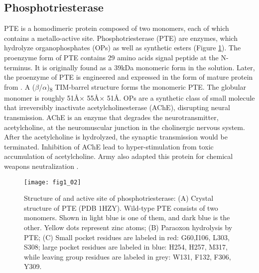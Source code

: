 \begin{refsection}
\subsection{Phosphotriesterase} 
\label{sec:pte-intro}

PTE is a homodimeric protein composed of two monomers, each of which contains a
metallo-active site. Phosphotriesterase (PTE) are enzymes, which hydrolyze
organophosphates (OPs) as well as synthetic esters (Figure
\ref{fig:pte-structure})\cite{Ghanem2005a}. The proenzyme form of PTE contains
29 amino acids signal peptide at the N-terminus. It is originally found as a
39kDa monomeric form in the solution\cite{Mulbry1989}. Later, the proenzyme of
PTE is engineered and expressed in the form of mature protein from . A ($\beta$/$\alpha$)\textsubscript{8} TIM-barrel structure forms the
monomeric PTE\cite{Roodveldt2005,Seibert2005}. The globular monomer is roughly
51\AA $\times$ 55\AA $\times$ 51\AA.  OPs are a synthetic class of small molecule
that irreversibly inactivate acetylcholinesterase (AChE), disrupting
neural transmission. AChE is an enzyme that degrades the neurotransmitter,
acetylcholine, at the neuromuscular junction in the cholinergic nervous system.
After the acetylcholine is hydrolyzed, the synaptic transmission would be
terminated. Inhibition of AChE lead to hyper-stimulation from toxic
accumulation of acetylcholine\cite{Soreq2001}. Army also adapted this protein
for chemical weapons neutralization \cite{Yang2014a}.

\begin{figure}[h!] \centering \texttt{[image: fig1\_02]}
    \caption[Structure of and active site of phosphotriesterase: (A) Crystal
    structure of PTE (PDB 1HZY). Wild-type PTE consists of two monomers. Shown
in light blue is one of them, and dark blue is the other. Yellow dots represent
zinc atoms; (B) Paraoxon hydrolysis by PTE; (C) Small pocket residues are
labeled in red: G60,I106, L303, S308; large pocket residues are labeled in
blue: H254, H257, M317, while leaving group residues are labeled in grey: W131,
F132, F306, Y309.] {Structure of and active site of phosphotriesterase: (A)
Crystal structure of PTE (PDB 1HZY). Wild-type PTE consists of two monomers.
Shown in light blue is one of them, and dark blue is the other. Yellow dots
represent zinc atoms; (B) Paraoxon hydrolysis by PTE;  (C) Small pocket
residues are labeled in red: G60,I106, L303, S308; large pocket residues are
labeled in blue: H254, H257, M317, while leaving group residues are labeled in
grey: W131, F132, F306, Y309.}
\label{fig:pte-structure} 
\end{figure} 


\end{refsection}
